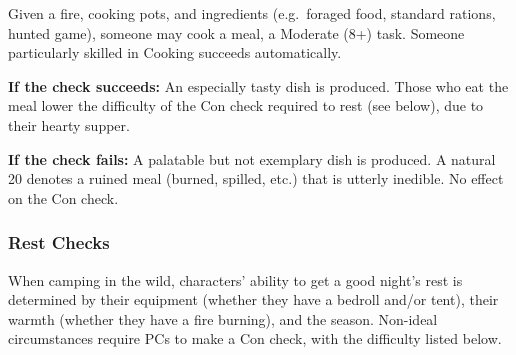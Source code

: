 \documentclass{article}
\begin{document}
\begin{multicols}{2}
Given a fire, cooking pots, and ingredients (e.g.~foraged food, standard
rations, hunted game), someone may cook a meal, a Moderate (8+) task.
Someone particularly skilled in Cooking succeeds automatically.

\textbf{If the check succeeds:} An especially tasty dish is produced.
Those who eat the meal lower the difficulty of the Con check required to
rest (see below), due to their hearty supper.

\textbf{If the check fails:} A palatable but not exemplary dish is
produced. A natural 20 denotes a ruined meal (burned, spilled, etc.)
that is utterly inedible. No effect on the Con check.

\subsubsection{Rest Checks}\label{rest-checks}

When camping in the wild, characters' ability to get a good night's rest
is determined by their equipment (whether they have a bedroll and/or
tent), their warmth (whether they have a fire burning), and the season.
Non-ideal circumstances require PCs to make a Con check, with the
difficulty listed below.


\end{multicols}
\end{document}

